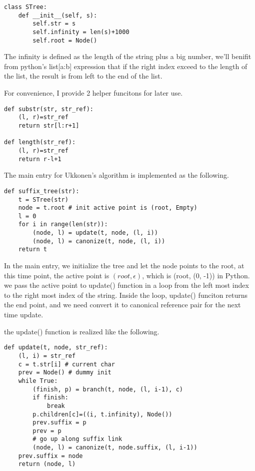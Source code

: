 \documentclass{article}
\begin{document}
\begin{lstlisting}
class STree:
    def __init__(self, s):
        self.str = s
        self.infinity = len(s)+1000
        self.root = Node()
\end{lstlisting}

The infinity is defined as the length of the string plus a big number, we'll
benifit from python's list[a:b] expression that if the right index exceed to the
length of the list, the result is from left to the end of the list.

For convenience, I provide 2 helper funcitons for later use.

\begin{lstlisting}
def substr(str, str_ref):
    (l, r)=str_ref
    return str[l:r+1]

def length(str_ref):
    (l, r)=str_ref
    return r-l+1
\end{lstlisting}

The main entry for Ukkonen's algorithm is implemented as the following.

\begin{lstlisting}
def suffix_tree(str):
    t = STree(str)
    node = t.root # init active point is (root, Empty)
    l = 0
    for i in range(len(str)):
        (node, l) = update(t, node, (l, i))
        (node, l) = canonize(t, node, (l, i))
    return t
\end{lstlisting}

In the main entry, we initialize the tree and let the node points to the
root, at this time point, the active point is $(root, \epsilon)$, which
is (root, (0, -1)) in Python. we pass the active point to update() function 
in a loop from the left most index to the right most index of the string.
Inside the loop, update() funciton returns the end point, and we need 
convert it to canonical reference pair for the next time update.

the update() function is realized like the following.

\begin{lstlisting}
def update(t, node, str_ref):
    (l, i) = str_ref 
    c = t.str[i] # current char
    prev = Node() # dummy init 
    while True:
        (finish, p) = branch(t, node, (l, i-1), c)
        if finish:
            break
        p.children[c]=((i, t.infinity), Node())
        prev.suffix = p
        prev = p
        # go up along suffix link
        (node, l) = canonize(t, node.suffix, (l, i-1))
    prev.suffix = node
    return (node, l)
\end{lstlisting}
\end{document}
